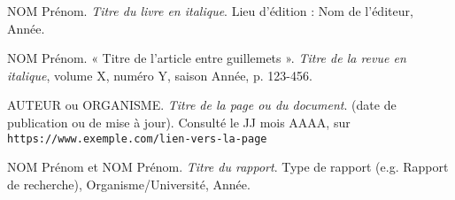\newpage %


\begin{thebibliography}{9}

NOM Prénom. \textit{Titre du livre en italique}. Lieu d'édition : Nom de l'éditeur, Année.

NOM Prénom. « Titre de l'article entre guillemets ». \textit{Titre de la revue en italique}, volume X, numéro Y, saison Année, p. 123-456.

AUTEUR ou ORGANISME. \textit{Titre de la page ou du document}. (date de publication ou de mise à jour). Consulté le JJ mois AAAA, sur \texttt{https://www.exemple.com/lien-vers-la-page}

NOM Prénom et NOM Prénom. \textit{Titre du rapport}. Type de rapport (e.g. Rapport de recherche), Organisme/Université, Année.

\end{thebibliography}